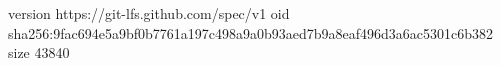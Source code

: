 version https://git-lfs.github.com/spec/v1
oid sha256:9fac694e5a9bf0b7761a197c498a9a0b93aed7b9a8eaf496d3a6ac5301c6b382
size 43840
